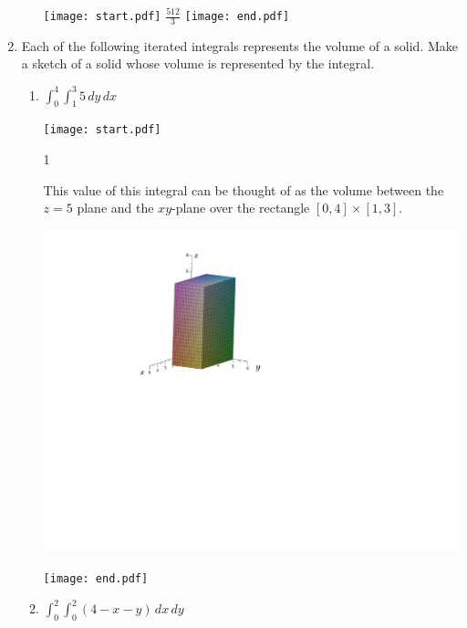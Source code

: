 \documentclass[12pt]{article}
\begin{document}
\begin{enumerate}
\begin{enumerate}
\texttt{[image: start.pdf]}
{{$\frac{512}{3}$}}
\texttt{[image: end.pdf]}


\end{enumerate}

\item Each of the following iterated integrals represents the volume of a solid.  Make a sketch of a solid whose volume is represented by the integral.  

\begin{enumerate}

\item $\int_0^4 \int_1^3 {5} \,dy \,dx$

\texttt{[image: start.pdf]}
{{{1\linewidth}{This value of this integral can be thought of as the volume between the $z=5$ plane and the $xy$-plane over the rectangle $[0,4]\times[1,3]$.\\
\begin{center}
\includegraphics[scale=0.4]{box.pdf}
\end{center}
}}}
\texttt{[image: end.pdf]}


\newpage

\item $\int_0^2 \int_0^2 {(4-x-y)} \,dx \,dy$


\end{enumerate}
\end{enumerate}
\end{document}
